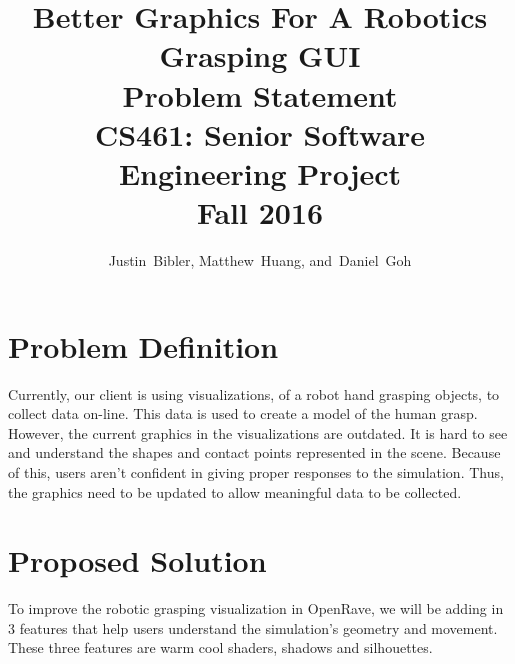 \documentclass[10pt,journal,compsoc]{IEEEtran}
\begin{document}
\onecolumn
\begin{titlepage}
\title{Better Graphics For A Robotics Grasping GUI\\ Problem Statement \\  [0.5em] 
	\large CS461: Senior Software Engineering Project \\ Fall 2016}

\author{Justin~Bibler,
        Matthew~Huang,
        and~Daniel~Goh}
		

\maketitle

\end{titlepage}

\section{Problem Definition}
Currently, our client is using visualizations, of a robot hand grasping objects, to collect data on-line.
This data is used to create a model of the human grasp.
However, the current graphics in the visualizations are outdated.
It is hard to see and understand the shapes and contact points represented in the scene.
Because of this, users aren't confident in giving proper responses to the simulation.
Thus, the graphics need to be updated to allow meaningful data to be collected.

\section{Proposed Solution}
To improve the robotic grasping visualization in OpenRave, we will be adding in 3 features that help users understand the simulation's geometry and movement. 
These three features are warm cool shaders, shadows and silhouettes. \par
\end{document}
